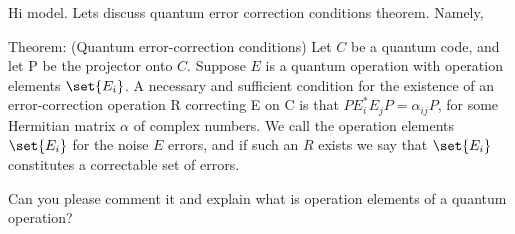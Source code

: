 \begin{ai}
Hi model. Lets discuss quantum error correction conditions theorem. Namely,

Theorem: (Quantum error-correction conditions) Let $C$ be a quantum code,
and let P be the projector onto $C$. Suppose $E$ is a quantum operation with
operation elements $\set{E_i}$. A necessary and sufficient condition for the existence
of an error-correction operation R correcting E on C is that
$P E^{*}_i E_j P = \alpha_{ij} P$,
for some Hermitian matrix $\alpha$ of complex numbers.
We call the operation elements $\set{E_i}$ for the noise $E$ errors, and if such an $R$ exists
we say that $\set{E_i}$ constitutes a correctable set of errors.


Can you please comment it and explain what is operation elements of a quantum operation?
\end{ai}

